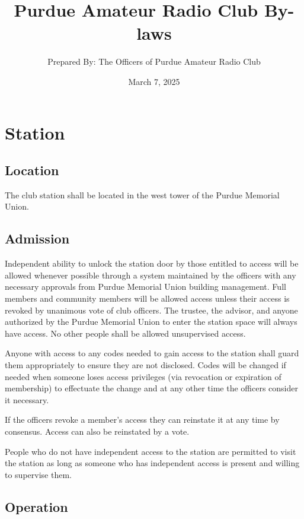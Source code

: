 \documentclass{article}
\title{\vspace*{\fill}Purdue Amateur Radio Club By-laws}
\author{Prepared By: The Officers of Purdue Amateur Radio Club}
\date{March 7, 2025\vspace*{\fill}\vspace*{\fill}}
\begin{document}
\maketitle
\newpage

\tableofcontents
\newpage

\section{Station}

\subsection{Location}

The club station shall be located in the west tower of the Purdue Memorial
Union.

\subsection{Admission}

Independent ability to unlock the station door by those entitled to access will
be allowed whenever possible through a system maintained by the officers with
any necessary approvals from Purdue Memorial Union building management. Full
members and community members will be allowed access unless their access is
revoked by unanimous vote of club officers. The trustee, the advisor, and anyone
authorized by the Purdue Memorial Union to enter the station space will always
have access. No other people shall be allowed unsupervised access.

Anyone with access to any codes needed to gain access to the station shall guard
them appropriately to ensure they are not disclosed. Codes will be changed if
needed when someone loses access privileges (via revocation or expiration of
membership) to effectuate the change and at any other time the officers consider
it necessary.

If the officers revoke a member's access they can reinstate it at any time by
consensus. Access can also be reinstated by a vote.

People who do not have independent access to the station are permitted to visit
the station as long as someone who has independent access is present and willing
to supervise them.

\subsection{Operation}
\end{document}
